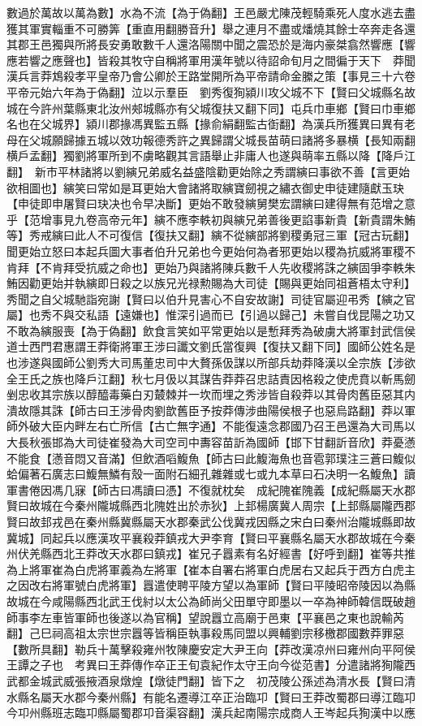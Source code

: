 數過於萬故以萬為數】水為不流【為于偽翻】王邑嚴尤陳茂輕騎乘死人度水逃去盡獲其軍實輜重不可勝筭【重直用翻勝音升】舉之連月不盡或燔燒其餘士卒奔走各還其郡王邑獨與所將長安勇敢數千人還洛陽關中聞之震恐於是海内豪桀翕然響應【響應若響之應聲也】皆殺其牧守自稱將軍用漢年號以待詔命旬月之間徧于天下　莽聞漢兵言莽鴆殺孝平皇帝乃會公卿於王路堂開所為平帝請命金縢之策【事見三十六卷平帝元始六年為于偽翻】泣以示羣臣　劉秀復狥潁川攻父城不下【賢曰父城縣名故城在今許州葉縣東北汝州郟城縣亦有父城復扶又翻下同】屯兵巾車鄉【賢曰巾車鄉名也在父城界】潁川郡掾馮異監五縣【掾俞絹翻監古衘翻】為漢兵所獲異曰異有老母在父城願歸據五城以效功報德秀許之異歸謂父城長苗萌曰諸將多暴横【長知兩翻横戶孟翻】獨劉將軍所到不虜略觀其言語舉止非庸人也遂與萌率五縣以降【降戶江翻】　新市平林諸將以劉縯兄弟威名益盛陰勸更始除之秀謂縯曰事欲不善【言更始欲相圖也】縯笑曰常如是耳更始大會諸將取縯寶劒視之繡衣御史申徒建隨獻玉玦【申徒即申屠賢曰玦决也令早决斷】更始不敢發縯舅樊宏謂縯曰建得無有范增之意乎【范增事見九卷高帝元年】縯不應李軼初與縯兄弟善後更諂事新貴【新貴謂朱鮪等】秀戒縯曰此人不可復信【復扶又翻】縯不從縯部將劉稷勇冠三軍【冠古玩翻】聞更始立怒曰本起兵圖大事者伯升兄弟也今更始何為者邪更始以稷為抗威將軍稷不肯拜【不肯拜受抗威之命也】更始乃與諸將陳兵數千人先收稷將誅之縯固爭李軼朱鮪因勸更始并執縯即日殺之以族兄光禄勲賜為大司徒【賜與更始同祖蒼梧太守利】秀聞之自父城馳詣宛謝【賢曰以伯升見害心不自安故謝】司徒官屬迎弔秀【縯之官屬】也秀不與交私語【遠嫌也】惟深引過而已【引過以歸己】未嘗自伐昆陽之功又不敢為縯服喪【為于偽翻】飲食言笑如平常更始以是慙拜秀為破虜大將軍封武信侯　道士西門君惠謂王莽衛將軍王涉曰讖文劉氏當復興【復扶又翻下同】國師公姓名是也涉遂與國師公劉秀大司馬董忠司中大贅孫伋謀以所部兵劫莽降漢以全宗族【涉欲全王氏之族也降戶江翻】秋七月伋以其謀告莽莽召忠詰責因格殺之使虎賁以斬馬劒剉忠收其宗族以醇醯毒藥白刃樷棘并一坎而埋之秀涉皆自殺莽以其骨肉舊臣惡其内潰故隱其誅【師古曰王涉骨肉劉歆舊臣予按莽傳涉曲陽侯根子也惡烏路翻】莽以軍師外破大臣内畔左右亡所信【古亡無字通】不能復遠念郡國乃召王邑還為大司馬以大長秋張邯為大司徒崔發為大司空司中夀容苗訢為國師【邯下甘翻訢音欣】莽憂懣不能食【懣音悶又音滿】但飲酒㗖鰒魚【師古曰此鰒海魚也音雹郭璞注三蒼曰鰒似蛤偏著石廣志曰鰒無鱗有殼一面附石細孔雜雜或七或九本草曰石决明一名鰒魚】讀軍書倦因馮几寐【師古曰馮讀曰憑】不復就枕矣　成紀隗崔隗義【成紀縣屬天水郡賢曰故城在今秦州隴城縣西北隗姓出於赤狄】上邽楊廣冀人周宗【上邽縣屬隴西郡賢曰故邽戎邑在秦州縣冀縣屬天水郡秦武公伐冀戎因縣之宋白曰秦州治隴城縣即故冀城】同起兵以應漢攻平襄殺莽鎮戎大尹李育【賢曰平襄縣名屬天水郡故城在今秦州伏羌縣西北王莽改天水郡曰鎮戎】崔兄子囂素有名好經書【好呼到翻】崔等共推為上將軍崔為白虎將軍義為左將軍【崔本自署右將軍白虎居右又起兵于西方白虎主之因改右將軍號白虎將軍】囂遣使聘平陵方望以為軍師【賢曰平陵昭帝陵因以為縣故城在今咸陽縣西北武王伐紂以太公為師尚父田單守即墨以一卒為神師韓信既破趙師事李左車皆軍師也後遂以為官稱】望說囂立高廟于邑東【平襄邑之東也說輸芮翻】己巳祠高祖太宗世宗囂等皆稱臣執事殺馬同盟以興輔劉宗移檄郡國數莽罪惡【數所具翻】勒兵十萬擊殺雍州牧陳慶安定大尹王向【莽改漢凉州曰雍州向平阿侯王譚之子也　考異曰王莽傳作卒正王旬袁紀作太守王向今從范書】分遣諸將狥隴西武都金城武威張掖酒泉燉煌【燉徒門翻】皆下之　初茂陵公孫述為清水長【賢曰清水縣名屬天水郡今秦州縣】有能名遷導江卒正治臨卭【賢曰王莽改蜀郡曰導江臨卭今卭州縣班志臨卭縣屬蜀郡卭音渠容翻】漢兵起南陽宗成商人王岑起兵狥漢中以應